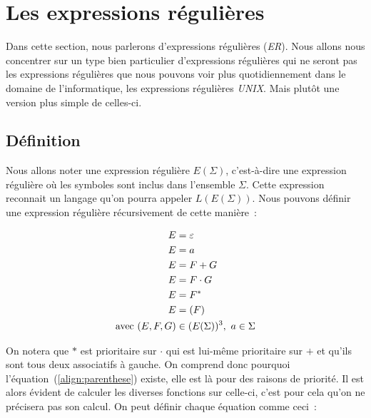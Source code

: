\section{Les expressions régulières}

Dans cette section, nous parlerons d'expressions régulières (\textit{ER}). Nous
allons nous concentrer sur un type bien particulier d'expressions régulières
qui ne seront pas les expressions régulières que nous pouvons voir plus
quotidiennement dans le domaine de l'informatique, les expressions régulières
\textit{UNIX}. Mais plutôt une version plus simple de celles-ci.

\subsection{Définition}

Nous allons noter une expression régulière \(E(\Sigma)\), c'est-à-dire une
expression régulière où les symboles sont inclus dans l'ensemble \(\Sigma\).
Cette expression reconnait un langage qu'on pourra appeler \(L(E(\Sigma))\).
Nous pouvons définir une expression régulière récursivement de cette manière~:

\begin{align}
    E                      & = \varepsilon                          \\
    E                      & = a                                    \\
    E                      & = F + G                                \\
    E                      & = F \cdot G                            \\
    E                      & = F^*                                  \\
    E                      & = (F)\label{align:parenthese}          \\
    \text{avec } (E, F, G) & \in (E(\Sigma))^3,~ a \in \Sigma\notag
\end{align}

On notera que \(*\) est prioritaire sur \(\cdot\) qui est lui-même prioritaire
sur \(+\) et qu'ils sont tous deux associatifs à gauche. On comprend donc
pourquoi l'équation~(\ref{align:parenthese}) existe, elle est là pour des
raisons de priorité. Il est alors évident de calculer les diverses fonctions
sur celle-ci, c'est pour cela qu'on ne précisera pas son
calcul\label{text:parenthese}. On peut définir chaque équation comme ceci~:

\vphantom{}

